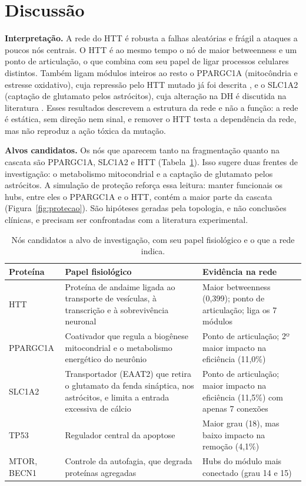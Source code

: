 \documentclass[12pt,a4paper]{article}
\begin{document}
\section{Discussão}

\textbf{Interpretação.} A rede do HTT é robusta a falhas aleatórias e frágil a ataques a poucos nós centrais. O HTT é ao mesmo tempo o nó de maior betweenness e um ponto de articulação, o que combina com seu papel de ligar processos celulares distintos. Também ligam módulos inteiros ao resto o PPARGC1A (mitocôndria e estresse oxidativo), cuja repressão pelo HTT mutado já foi descrita \cite{cui2006}, e o SLC1A2 (captação de glutamato pelos astrócitos), cuja alteração na DH é discutida na literatura \cite{khakh2017}. Esses resultados descrevem a estrutura da rede e não a função: a rede é estática, sem direção nem sinal, e remover o HTT testa a dependência da rede, mas não reproduz a ação tóxica da mutação.

\textbf{Alvos candidatos.} Os nós que aparecem tanto na fragmentação quanto na cascata são PPARGC1A, SLC1A2 e HTT (Tabela~\ref{tab:alvos}). Isso sugere duas frentes de investigação: o metabolismo mitocondrial e a captação de glutamato pelos astrócitos. A simulação de proteção reforça essa leitura: manter funcionais os hubs, entre eles o PPARGC1A e o HTT, contém a maior parte da cascata (Figura~\ref{fig:protecao}). São hipóteses geradas pela topologia, e não conclusões clínicas, e precisam ser confrontadas com a literatura experimental.

\begin{table}[H]
  \centering
  \caption{Nós candidatos a alvo de investigação, com seu papel fisiológico e o que a rede indica.}
  \label{tab:alvos}
  \footnotesize
  \begin{tabular}{p{1.8cm}p{4.6cm}p{5.6cm}}
    \toprule
    Proteína & Papel fisiológico & Evidência na rede \\
    \midrule
    HTT & Proteína de andaime ligada ao transporte de vesículas, à transcrição e à sobrevivência neuronal & Maior betweenness (0,399); ponto de articulação; liga os 7 módulos \\
    PPARGC1A & Coativador que regula a biogênese mitocondrial e o metabolismo energético do neurônio & Ponto de articulação; 2º maior impacto na eficiência (11,0\%) \\
    SLC1A2 & Transportador (EAAT2) que retira o glutamato da fenda sináptica, nos astrócitos, e limita a entrada excessiva de cálcio & Ponto de articulação; maior impacto na eficiência (11,5\%) com apenas 7 conexões \\
    TP53 & Regulador central da apoptose & Maior grau (18), mas baixo impacto na remoção (4,1\%) \\
    MTOR, BECN1 & Controle da autofagia, que degrada proteínas agregadas & Hubs do módulo mais conectado (grau 14 e 15) \\
    \bottomrule
  \end{tabular}
\end{table}
\end{document}
